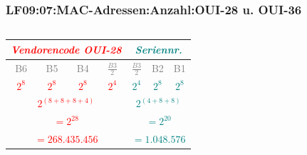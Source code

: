\begin{frame}  
  \frametitle{LF09:07:MAC-Adressen:Anzahl:OUI-28 u. OUI-36}
  \begin{footnotesize} 
  
  \begin{columns}[t]

  \begin{center}
    \renewcommand{\arraystretch}{1.5}
    \begin{tabular}{| c | c | c | c || c | c | c |}
      \hline
      \multicolumn{4}{|c||}{\tiny{\textit{\textrm{\textcolor{red}{Vendorencode OUI-28}}}}} 
             & \multicolumn{3}{c|}{{\tiny{\textit{\textrm{\textcolor{teal}{Seriennr.}}}}}} \\
      \hline
      \textcolor{gray}{\tiny{B6}} & \textcolor{gray}{\tiny{B5}} 
          & \textcolor{gray}{\tiny{B4}} & \textcolor{gray}{\tiny{$\frac{B3}{2}$}} 
            & \textcolor{gray}{\tiny{$\frac{B3}{2}$}} & \textcolor{gray}{\tiny{B2}} 
              & \textcolor{gray}{\tiny{B1}} \\
      \hline
      \textcolor{red}{\texttt{$2^8$}} & \textcolor{red}{\texttt{$2^8$}} 
        & \textcolor{red}{\texttt{$2^8$}} & \textcolor{red}{\texttt{$2^4$}}
      & \textcolor{teal}{\texttt{$2^4$}} & \textcolor{teal}{\texttt{$2^8$}} 
        & \textcolor{teal}{\texttt{$2^8$}} \\
      \hline
      \hline
      \multicolumn{4}{|c||}{\textcolor{red}{\texttt{$2^{(8 + 8 + 8 +4)}$}}}
        & \multicolumn{3}{c|}{\textcolor{teal}{\texttt{$2^{(4 + 8 + 8)}$}}} \\
      \hline
      \hline
      \multicolumn{4}{|c||}{\textcolor{red}{\texttt{$= 2^{28}$}}}
        & \multicolumn{3}{c|}{\textcolor{teal}{\texttt{$= 2^{20}$}}} \\
      \hline
      \multicolumn{4}{|c||}{\textcolor{red}{\texttt{$= 268.435.456$}}}
        & \multicolumn{3}{c|}{\textcolor{teal}{\texttt{$= 1.048.576$}}} \\
      \hline
    \end{tabular}
  \end{center}


\end{columns}
\end{footnotesize}
\end{frame}
